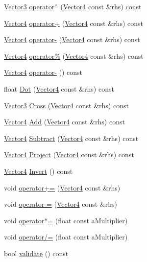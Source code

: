 \begin{DoxyCompactItemize}
\item 
\hyperlink{structVector3}{Vector3} \hyperlink{structVector4_ad46b6e31919f97b5e0488f5deb4ec554}{operator$^\wedge$} (\hyperlink{structVector4}{Vector4} const \&rhs) const 
\item 
\hyperlink{structVector4}{Vector4} \hyperlink{structVector4_a25adb38d34c050ee524aca72bdd09b89}{operator+} (\hyperlink{structVector4}{Vector4} const \&rhs) const 
\item 
\hyperlink{structVector4}{Vector4} \hyperlink{structVector4_a00080b7c49acbfa5e91e86a81b6aaf74}{operator-\/} (\hyperlink{structVector4}{Vector4} const \&rhs) const 
\item 
\hyperlink{structVector4}{Vector4} \hyperlink{structVector4_aec405195c95998e16b1a2869fc49372e}{operator\%} (\hyperlink{structVector4}{Vector4} const \&rhs) const 
\item 
\hyperlink{structVector4}{Vector4} \hyperlink{structVector4_ac5116f6a6d22ccbb8502a48b4d2e9cef}{operator-\/} () const 
\item 
float \hyperlink{structVector4_a0fa2dc439d1aa522437fc8edb96625eb}{Dot} (\hyperlink{structVector4}{Vector4} const \&rhs) const 
\item 
\hyperlink{structVector3}{Vector3} \hyperlink{structVector4_af00b9f819d36d14ca41474209d515ca8}{Cross} (\hyperlink{structVector4}{Vector4} const \&rhs) const 
\item 
\hyperlink{structVector4}{Vector4} \hyperlink{structVector4_acb9bc455ad9b5064b42fd07f7bfe40c5}{Add} (\hyperlink{structVector4}{Vector4} const \&rhs) const 
\item 
\hyperlink{structVector4}{Vector4} \hyperlink{structVector4_a2dd3c582bec1a84e2803c56fb32217ff}{Subtract} (\hyperlink{structVector4}{Vector4} const \&rhs) const 
\item 
\hyperlink{structVector4}{Vector4} \hyperlink{structVector4_a5f2d9b3a8cda2c93a68e37e85035f337}{Project} (\hyperlink{structVector4}{Vector4} const \&rhs) const 
\item 
\hyperlink{structVector4}{Vector4} \hyperlink{structVector4_a845f4056201cba4d65f4866d197137e5}{Invert} () const 
\item 
void \hyperlink{structVector4_a4866b12981135325529e3309af43ecaf}{operator+=} (\hyperlink{structVector4}{Vector4} const \&rhs)
\item 
void \hyperlink{structVector4_a595c8434af012bab3b6b8620d312fdeb}{operator-\/=} (\hyperlink{structVector4}{Vector4} const \&rhs)
\item 
void \hyperlink{structVector4_a0df110691d153207f63d08ba866968a2}{operator$\ast$=} (float const a\+Multiplier)
\item 
void \hyperlink{structVector4_a59bff3070bc4a1767c98a549026d4010}{operator/=} (float const a\+Multiplier)
\item 
bool \hyperlink{structVector4_a4df5ca936cf04c18bdf1c11872cc4a1b}{validate} () const 
\end{DoxyCompactItemize}
